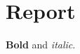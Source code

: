 \documentclass{report}
\begin{document}
\chapter{Report}\textbf{Bold} and \textit{italic}.
\end{document}

